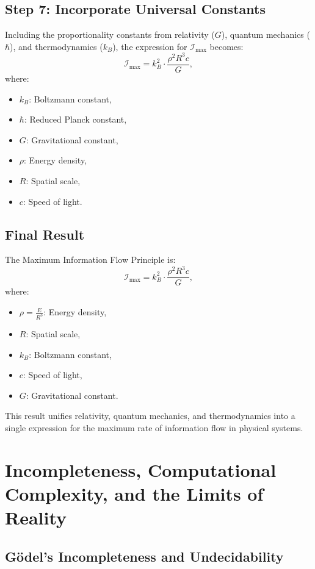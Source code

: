 \documentclass[12pt]{article}
\begin{document}
\subsection{Step 7: Incorporate Universal Constants}

Including the proportionality constants from relativity ($G$), quantum mechanics ($\hbar$), and thermodynamics ($k_B$), the expression for $\mathcal{I}_{\text{max}}$ becomes:
\[
\mathcal{I}_{\text{max}} = k_B^2 \cdot \frac{\rho^2 R^3 c}{G},
\]
where:
\begin{itemize}
    \item $k_B$: Boltzmann constant,
    \item $\hbar$: Reduced Planck constant,
    \item $G$: Gravitational constant,
    \item $\rho$: Energy density,
    \item $R$: Spatial scale,
    \item $c$: Speed of light.
\end{itemize}

\subsection{Final Result}

The Maximum Information Flow Principle is:
\[
\mathcal{I}_{\text{max}} = k_B^2 \cdot \frac{\rho^2 R^3 c}{G},
\]
where:
\begin{itemize}
    \item $\rho = \frac{E}{R^3}$: Energy density,
    \item $R$: Spatial scale,
    \item $k_B$: Boltzmann constant,
    \item $c$: Speed of light,
    \item $G$: Gravitational constant.
\end{itemize}
This result unifies relativity, quantum mechanics, and thermodynamics into a single expression for the maximum rate of information flow in physical systems.


\section{Incompleteness, Computational Complexity, and the Limits of Reality}

\subsection{Gödel’s Incompleteness and Undecidability}
\end{document}

